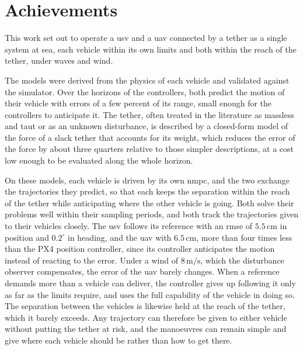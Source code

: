 
\section{Achievements}
\label{sec:concl_summary}

This work set out to operate a \gls{usv} and a \gls{uav} connected by a tether as a single system at sea, each vehicle within its own limits and both within the reach of the tether, under waves and wind.

The models were derived from the physics of each vehicle and validated against the simulator. Over the horizons of the controllers, both predict the motion of their vehicle with errors of a few percent of its range, small enough for the controllers to anticipate it. The tether, often treated in the literature as massless and taut or as an unknown disturbance, is described by a closed-form model of the force of a slack tether that accounts for its weight, which reduces the error of the force by about three quarters relative to those simpler descriptions, at a cost low enough to be evaluated along the whole horizon.

On these models, each vehicle is driven by its own \gls{nmpc}, and the two exchange the trajectories they predict, so that each keeps the separation within the reach of the tether while anticipating where the other vehicle is going. Both solve their problems well within their sampling periods, and both track the trajectories given to their vehicles closely. The \gls{usv} follows its reference with an \gls{rmse} of $5.5\,\text{cm}$ in position and $0.2^\circ$ in heading, and the \gls{uav} with $6.5\,\text{cm}$, more than four times less than the PX4 position controller, since its controller anticipates the motion instead of reacting to the error. Under a wind of $8\,\text{m/s}$, which the disturbance observer compensates, the error of the \gls{uav} barely changes. When a reference demands more than a vehicle can deliver, the controller gives up following it only as far as the limits require, and uses the full capability of the vehicle in doing so. The separation between the vehicles is likewise held at the reach of the tether, which it barely exceeds. Any trajectory can therefore be given to either vehicle without putting the tether at risk, and the manoeuvres can remain simple and give where each vehicle should be rather than how to get there.

